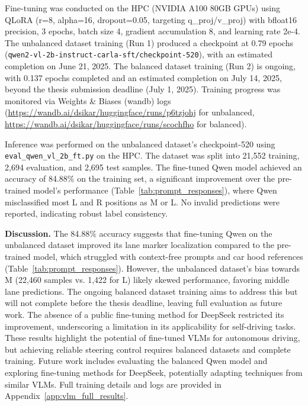 Fine-tuning was conducted on the HPC (NVIDIA A100 80GB GPUs) using QLoRA (r=8, alpha=16, dropout=0.05, targeting q\_proj/v\_proj) with bfloat16 precision, 3 epochs, batch size 4, gradient accumulation 8, and learning rate 2e-4. The unbalanced dataset training (Run 1) produced a checkpoint at 0.79 epochs (\texttt{qwen2-vl-2b-instruct-carla-sft/checkpoint-520}), with an estimated completion on June 21, 2025. The balanced dataset training (Run 2) is ongoing, with 0.137 epochs completed and an estimated completion on July 14, 2025, beyond the thesis submission deadline (July 1, 2025). Training progress was monitored via Weights \& Biases (wandb) logs (\url{https://wandb.ai/dsikar/huggingface/runs/p6tzjohj} for unbalanced, \url{https://wandb.ai/dsikar/huggingface/runs/scochfho} for balanced).

Inference was performed on the unbalanced dataset’s checkpoint-520 using \texttt{eval\_qwen\_vl\_2b\_ft.py} on the HPC. The dataset was split into 21,552 training, 2,694 evaluation, and 2,695 test samples. The fine-tuned Qwen model achieved an accuracy of 84.88\% on the training set, a significant improvement over the pre-trained model’s performance (Table~\ref{tab:prompt_responses}), where Qwen misclassified most L and R positions as M or L. No invalid predictions were reported, indicating robust label consistency.

\textbf{Discussion.} The 84.88\% accuracy suggests that fine-tuning Qwen on the unbalanced dataset improved its lane marker localization compared to the pre-trained model, which struggled with context-free prompts and car hood references (Table~\ref{tab:prompt_responses}). However, the unbalanced dataset’s bias towards M (22,460 samples vs. 1,422 for L) likely skewed performance, favoring middle lane predictions. The ongoing balanced dataset training aims to address this but will not complete before the thesis deadline, leaving full evaluation as future work. The absence of a public fine-tuning method for DeepSeek restricted its improvement, underscoring a limitation in its applicability for self-driving tasks. These results highlight the potential of fine-tuned VLMs for autonomous driving, but achieving reliable steering control requires balanced datasets and complete training. Future work includes evaluating the balanced Qwen model and exploring fine-tuning methods for DeepSeek, potentially adapting techniques from similar VLMs. Full training details and logs are provided in Appendix~\ref{app:vlm_full_results}.


